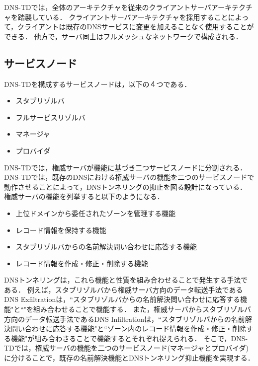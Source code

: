 DNS-TDでは，全体のアーキテクチャを従来のクライアントサーバアーキテクチャを踏襲している．
クライアントサーバアーキテクチャを採用することによって，クライアントは既存のDNSサービスに変更を加えることなく使用することができる．
他方で，サーバ同士はフルメッシュなネットワークで構成される．

\subsection{サービスノード}
DNS-TDを構成するサービスノードは，以下の４つである．
\begin{itemize}
 \item スタブリゾルバ
	\vspace{-3mm}
 \item フルサービスリゾルバ
	\vspace{-3mm}
 \item マネージャ
	\vspace{-3mm}
 \item プロバイダ
\end{itemize}

DNS-TDでは，権威サーバが機能に基づき二つサービスノードに分割される．
DNS-TDでは，既存のDNSにおける権威サーバの機能を二つのサービスノードで動作させることによって，DNSトンネリングの抑止を図る設計になっている．
権威サーバの機能を列挙すると以下のようになる．
\begin{itemize}
 \item 上位ドメインから委任されたゾーンを管理する機能
	\vspace{-3mm}
 \item レコード情報を保持する機能
	\vspace{-3mm}
 \item スタブリゾルバからの名前解決問い合わせに応答する機能
	\vspace{-3mm}
 \item レコード情報を作成・修正・削除する機能
\end{itemize}
DNSトンネリングは，これら機能と性質を組み合わせることで発生する手法である．
例えば，スタブリゾルバから権威サーバ方向のデータ転送手法であるDNS Exfiltrationは，``スタブリゾルバからの名前解決問い合わせに応答する機能"と``"を組み合わせることで機能する．
また，権威サーバからスタブリゾルバ方向のデータ転送手法であるDNS Infiltrationは，``スタブリゾルバからの名前解決問い合わせに応答する機能"と``ゾーン内のレコード情報を作成・修正・削除する機能"が組み合わさることで機能するとそれぞれ捉えられる．
そこで，DNS-TDでは，権威サーバの機能を二つのサービスノード(マネージャとプロバイダ)に分けることで，既存の名前解決機能とDNSトンネリング抑止機能を実現する．\newline

